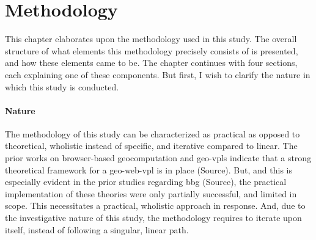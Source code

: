 \chapter{Methodology}
\label{chap:methodology}

This chapter elaborates upon the methodology used in this study. 
The overall structure of what elements this methodology precisely consists of is presented, and how these elements came to be. 
The chapter continues with four sections, each explaining one of these components.
But first, I wish to clarify the nature in which this study is conducted. 

\subsubsection*{Nature}
The methodology of this study can be characterized as practical as opposed to theoretical, wholistic instead of specific, and iterative compared to linear. The prior works on browser-based geocomputation and geo-vpls indicate that a strong theoretical framework for a \ac{geo-web-vpl} is in place (Source). 
But, and this is especially evident in the prior studies regarding \ac{bbg} (Source), the practical implementation of these theories were only partially successful, and limited in scope. 
This necessitates a practical, wholistic approach in response. 
And, due to the investigative nature of this study, the methodology requires to iterate upon itself, instead of following a singular, linear path. 



